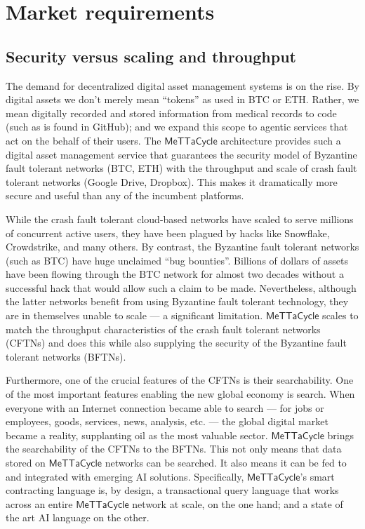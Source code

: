 \documentclass{article}
\newcommand{\MC}{\mathsf{MeTTaCycle}}
\begin{document}
\section{Market requirements}

\subsection{Security versus scaling and throughput}
The demand for decentralized digital asset management systems is on
the rise. By digital assets we don’t merely mean “tokens” as used in
BTC or ETH. Rather, we mean digitally recorded and stored information
from medical records to code (such as is found in GitHub); and we
expand this scope to agentic services that act on the behalf of their
users. The $\MC$ architecture provides such a digital asset
management service that guarantees the security model of Byzantine
fault tolerant networks (BTC, ETH) with the throughput and scale of
crash fault tolerant networks (Google Drive, Dropbox). This makes it
dramatically more secure and useful than any of the incumbent
platforms.

While the crash fault tolerant cloud-based networks have scaled to
serve millions of concurrent active users, they have been plagued by
hacks like Snowflake, Crowdstrike, and many others. By contrast, the
Byzantine fault tolerant networks (such as BTC) have huge unclaimed
``bug bounties''. Billions of dollars of assets have been flowing
through the BTC network for almost two decades without a successful
hack that would allow such a claim to be made. Nevertheless, although
the latter networks benefit from using Byzantine fault tolerant
technology, they are in themselves unable to scale --- a significant
limitation. $\MC$ scales to match the throughput characteristics of the
crash fault tolerant networks (CFTNs) and does this while also
supplying the security of the Byzantine fault tolerant networks
(BFTNs).

Furthermore, one of the crucial features of the CFTNs is their
searchability. One of the most important features enabling the new
global economy is search. When everyone with an Internet connection
became able to search --- for jobs or employees, goods, services, news,
analysis, etc. --- the global digital market became a reality,
supplanting oil as the most valuable sector. $\MC$ brings the
searchability of the CFTNs to the BFTNs. This not only means that data
stored on $\MC$ networks can be searched. It also means it can be
fed to and integrated with emerging AI solutions. Specifically,
$\MC$’s smart contracting language is, by design, a transactional
query language that works across an entire $\MC$ network at
scale, on the one hand; and a state of the art AI language on the other.
\end{document}
